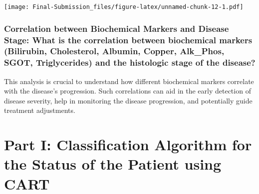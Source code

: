 \documentclass[
]{article}
\newenvironment{Shaded}{\begin{snugshade}}{\end{snugshade}}
\newcommand{\AttributeTok}[1]{\textcolor[rgb]{0.13,0.29,0.53}{#1}}
\newcommand{\CommentTok}[1]{\textcolor[rgb]{0.56,0.35,0.01}{\textit{#1}}}
\newcommand{\ConstantTok}[1]{\textcolor[rgb]{0.56,0.35,0.01}{#1}}
\newcommand{\FunctionTok}[1]{\textcolor[rgb]{0.13,0.29,0.53}{\textbf{#1}}}
\newcommand{\NormalTok}[1]{#1}
\newcommand{\OtherTok}[1]{\textcolor[rgb]{0.56,0.35,0.01}{#1}}
\newcommand{\SpecialCharTok}[1]{\textcolor[rgb]{0.81,0.36,0.00}{\textbf{#1}}}
\newcommand{\StringTok}[1]{\textcolor[rgb]{0.31,0.60,0.02}{#1}}
\begin{document}
\begin{Shaded}
\end{Shaded}

\texttt{[image: Final-Submission\_files/figure-latex/unnamed-chunk-12-1.pdf]}

\hypertarget{correlation-between-biochemical-markers-and-disease-stage-what-is-the-correlation-between-biochemical-markers-bilirubin-cholesterol-albumin-copper-alk_phos-sgot-triglycerides-and-the-histologic-stage-of-the-disease}{%
\subsubsection{Correlation between Biochemical Markers and Disease
Stage: What is the correlation between biochemical markers (Bilirubin,
Cholesterol, Albumin, Copper, Alk\_Phos, SGOT, Triglycerides) and the
histologic stage of the
disease?}\label{correlation-between-biochemical-markers-and-disease-stage-what-is-the-correlation-between-biochemical-markers-bilirubin-cholesterol-albumin-copper-alk_phos-sgot-triglycerides-and-the-histologic-stage-of-the-disease}}

This analysis is crucial to understand how different biochemical markers
correlate with the disease's progression. Such correlations can aid in
the early detection of disease severity, help in monitoring the disease
progression, and potentially guide treatment adjustments.

\hypertarget{part-i-classification-algorithm-for-the-status-of-the-patient-using-cart}{%
\section{Part I: Classification Algorithm for the Status of the Patient
using
CART}\label{part-i-classification-algorithm-for-the-status-of-the-patient-using-cart}}
\end{document}
